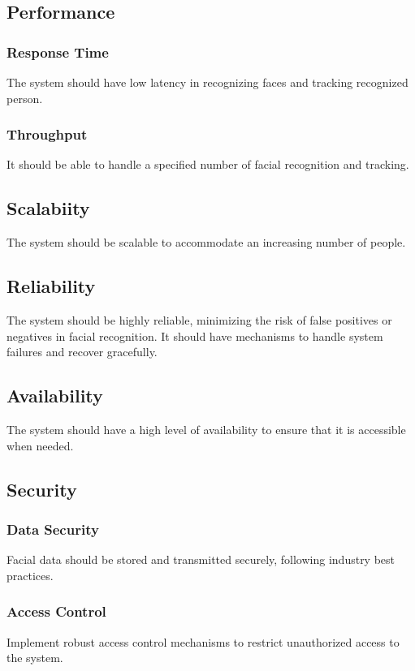            \subsection{Performance}
\subsubsection{Response Time} The system should have low latency in recognizing faces and tracking recognized person.
\subsubsection{Throughput} It should be able to handle a specified number of facial recognition and tracking.
\subsection{Scalabiity}
The system should be scalable to accommodate an increasing number of people.
\subsection{Reliability}
The system should be highly reliable, minimizing the risk of false positives or negatives in facial recognition.
It should have mechanisms to handle system failures and recover gracefully.
\subsection{Availability}
The system should have a high level of availability to ensure that it is accessible when needed.
\subsection{Security}
\subsubsection{Data Security} Facial data should be stored and transmitted securely, following industry best practices.
\subsubsection{Access Control}Implement robust access control mechanisms to restrict unauthorized access to the system.